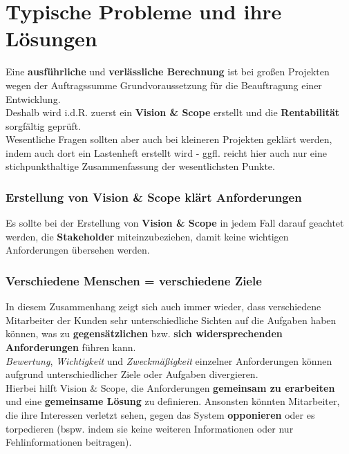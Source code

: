 \section{Typische Probleme und ihre Lösungen}

Eine \textbf{ausführliche} und \textbf{verlässliche Berechnung} ist bei großen Projekten wegen der Auftragssumme Grundvoraussetzung für die Beauftragung einer Entwicklung.\\

\noindent
Deshalb wird i.d.R. zuerst ein \textbf{Vision \& Scope} erstellt und die \textbf{Rentabilität} sorgfältig geprüft.\\

\noindent
Wesentliche Fragen sollten aber auch bei kleineren Projekten geklärt werden, indem auch dort ein Lastenheft erstellt wird - ggfl. reicht hier auch nur eine stichpunkthaltige Zusammenfassung der wesentlichsten Punkte.\\

\subsubsection*{Erstellung von Vision \& Scope klärt Anforderungen}
Es sollte bei der Erstellung von \textbf{Vision \& Scope} in jedem Fall darauf geachtet werden, die \textbf{Stakeholder} miteinzubeziehen, damit keine wichtigen Anforderungen übersehen werden.\\

\subsubsection*{Verschiedene Menschen = verschiedene Ziele}
In diesem Zusammenhang zeigt sich auch immer wieder, dass verschiedene Mitarbeiter der Kunden sehr unterschiedliche Sichten auf die Aufgaben haben können, was zu \textbf{gegensätzlichen} bzw. \textbf{sich widersprechenden Anforderungen} führen kann.\\
\textit{Bewertung}, \textit{Wichtigkeit} und \textit{Zweckmäßigkeit} einzelner Anforderungen können aufgrund unterschiedlicher Ziele oder Aufgaben divergieren.\\
Hierbei hilft Vision \& Scope, die Anforderungen \textbf{gemeinsam zu erarbeiten} und eine \textbf{gemeinsame Lösung} zu definieren.
Ansonsten könnten Mitarbeiter, die ihre Interessen verletzt sehen, gegen das System \textbf{opponieren} oder es torpedieren (bspw. indem sie keine weiteren Informationen oder nur Fehlinformationen beitragen).\\


